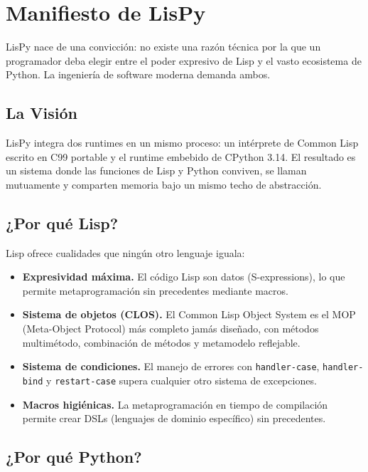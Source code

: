 \chapter{Manifiesto de LisPy}
\label{chap:manifesto}

LisPy nace de una convicción: no existe una razón técnica por la que un
programador deba elegir entre el poder expresivo de Lisp y el vasto
ecosistema de Python. La ingeniería de software moderna demanda ambos.

\section{La Visión}

LisPy integra dos runtimes en un mismo proceso: un intérprete de Common Lisp
escrito en C99 portable y el runtime embebido de CPython 3.14. El resultado
es un sistema donde las funciones de Lisp y Python conviven, se llaman
mutuamente y comparten memoria bajo un mismo techo de abstracción.

\section{¿Por qué Lisp?}

Lisp ofrece cualidades que ningún otro lenguaje iguala:

\begin{itemize}
\item \textbf{Expresividad máxima.} El código Lisp son datos (S-expressions),
  lo que permite metaprogramación sin precedentes mediante macros.
\item \textbf{Sistema de objetos (CLOS).} El Common Lisp Object System es el
  MOP (Meta-Object Protocol) más completo jamás diseñado, con métodos
  multimétodo, combinación de métodos y metamodelo reflejable.
\item \textbf{Sistema de condiciones.} El manejo de errores con
  \texttt{handler-case}, \texttt{handler-bind} y \texttt{restart-case}
  supera cualquier otro sistema de excepciones.
\item \textbf{Macros higiénicas.} La metaprogramación en tiempo de compilación
  permite crear DSLs (lenguajes de dominio específico) sin precedentes.
\end{itemize}

\section{¿Por qué Python?}


